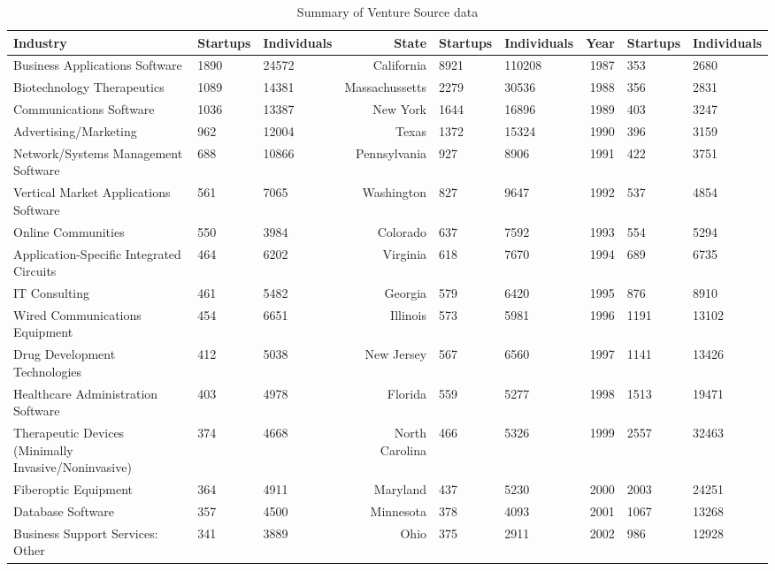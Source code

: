 \begin{table}[!htb]
\caption{Summary of Venture Source data}\label{table:VS_summaryTable}
\centering
\begingroup\scriptsize
\begin{tabular}{p{3.5cm}llrllrll}
  \toprule
Industry & Startups & Individuals & State & Startups & Individuals & Year & Startups & Individuals \\ 
  \midrule
Business Applications Software & 1890 & 24572 & California & 8921 & 110208 & 1987 & 353 & 2680 \\ 
  Biotechnology Therapeutics & 1089 & 14381 & Massachussetts & 2279 & 30536 & 1988 & 356 & 2831 \\ 
  Communications Software & 1036 & 13387 & New York & 1644 & 16896 & 1989 & 403 & 3247 \\ 
  Advertising/Marketing & 962 & 12004 & Texas & 1372 & 15324 & 1990 & 396 & 3159 \\ 
  Network/Systems Management Software & 688 & 10866 & Pennsylvania & 927 & 8906 & 1991 & 422 & 3751 \\ 
  Vertical Market Applications Software & 561 & 7065 & Washington & 827 & 9647 & 1992 & 537 & 4854 \\ 
  Online Communities & 550 & 3984 & Colorado & 637 & 7592 & 1993 & 554 & 5294 \\ 
  Application-Specific Integrated Circuits & 464 & 6202 & Virginia & 618 & 7670 & 1994 & 689 & 6735 \\ 
  IT Consulting & 461 & 5482 & Georgia & 579 & 6420 & 1995 & 876 & 8910 \\ 
  Wired Communications Equipment & 454 & 6651 & Illinois & 573 & 5981 & 1996 & 1191 & 13102 \\ 
  Drug Development Technologies & 412 & 5038 & New Jersey & 567 & 6560 & 1997 & 1141 & 13426 \\ 
  Healthcare Administration Software & 403 & 4978 & Florida & 559 & 5277 & 1998 & 1513 & 19471 \\ 
  Therapeutic Devices (Minimally Invasive/Noninvasive) & 374 & 4668 & North Carolina & 466 & 5326 & 1999 & 2557 & 32463 \\ 
  Fiberoptic Equipment & 364 & 4911 & Maryland & 437 & 5230 & 2000 & 2003 & 24251 \\ 
  Database Software & 357 & 4500 & Minnesota & 378 & 4093 & 2001 & 1067 & 13268 \\ 
  Business Support Services: Other & 341 & 3889 & Ohio & 375 & 2911 & 2002 & 986 & 12928 \\ 

\end{tabular}
\end{table}
